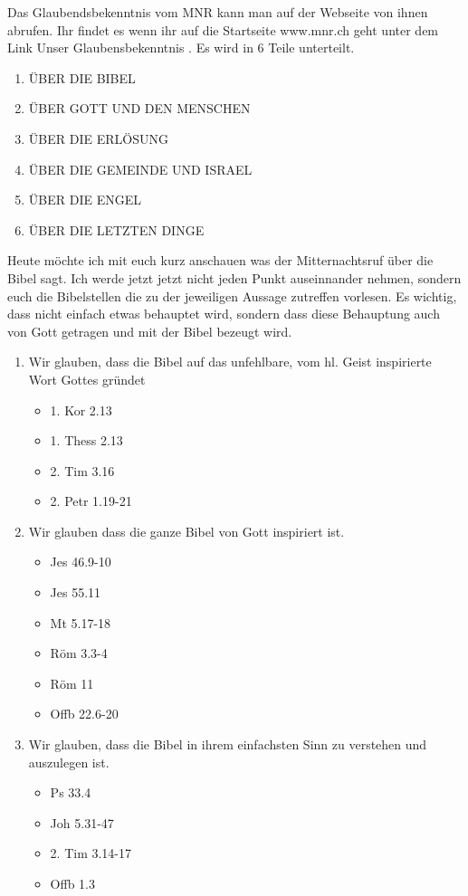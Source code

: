 \begin{spacing}{1.5}
Das Glaubendsbekenntnis vom MNR kann man auf der Webseite von ihnen abrufen. Ihr findet es wenn ihr auf die Startseite www.mnr.ch geht unter dem Link \frqq Unser Glaubensbekenntnis \flqq{}. Es wird in 6 Teile unterteilt.
\begin{enumerate}
    \item \uppercase{über die bibel}
    \item \uppercase{über gott und den Menschen}
    \item \uppercase{über die Erlösung}
    \item \uppercase{über die Gemeinde und Israel}
    \item \uppercase{über die Engel}
    \item \uppercase{über die letzten Dinge}
\end{enumerate}
Heute möchte ich mit euch kurz anschauen was der Mitternachtsruf über die Bibel sagt. Ich werde jetzt jetzt nicht jeden Punkt auseinnander nehmen, sondern euch die Bibelstellen die zu der jeweiligen Aussage zutreffen vorlesen. Es wichtig, dass nicht einfach etwas behauptet wird, sondern dass diese Behauptung auch von Gott getragen und mit der Bibel bezeugt wird.
\begin{enumerate}
    \item Wir glauben, dass die Bibel auf das unfehlbare, vom hl. Geist inspirierte Wort Gottes gründet
    \begin{itemize}
        \item 1. Kor 2.13
        \item 1. Thess 2.13
        \item 2. Tim 3.16
        \item 2. Petr 1.19-21
    \end{itemize}
    \item Wir glauben dass die ganze Bibel von Gott inspiriert ist.
    \begin{itemize}
        \item Jes 46.9-10
        \item Jes 55.11
        \item Mt 5.17-18
        \item Röm 3.3-4
        \item Röm 11
        \item Offb 22.6-20
    \end{itemize}
    \item Wir glauben, dass die Bibel in ihrem einfachsten Sinn zu verstehen und auszulegen ist.
    \begin{itemize}
        \item Ps 33.4
        \item Joh 5.31-47
        \item 2. Tim 3.14-17
        \item Offb 1.3
    \end{itemize}
\end{enumerate}


\end{spacing}
